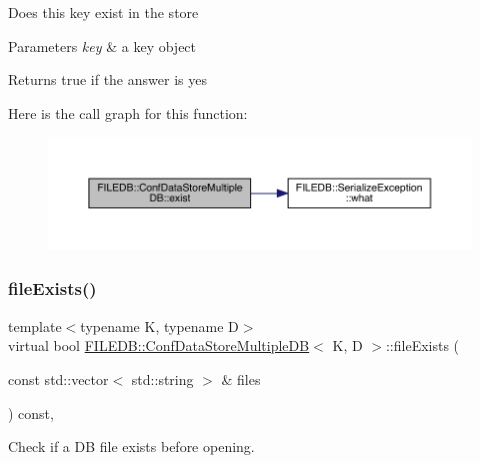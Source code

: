 Does this key exist in the store 
\begin{DoxyParams}{Parameters}
{\em key} & a key object \\
\hline
\end{DoxyParams}
\begin{DoxyReturn}{Returns}
true if the answer is yes 
\end{DoxyReturn}
Here is the call graph for this function\+:
\nopagebreak
\begin{figure}[H]
\begin{center}
\leavevmode
\includegraphics[width=350pt]{d3/dc0/classFILEDB_1_1ConfDataStoreMultipleDB_ad80312a9a4767f3b0b567932542d3ee7_cgraph}
\end{center}
\end{figure}
\mbox{\label{classFILEDB_1_1ConfDataStoreMultipleDB_a85c71818db3a3b0a5a67b4dabaed2ff7}} 
\subsubsection{\texorpdfstring{fileExists()}{fileExists()}\hspace{0.1cm}{\footnotesize\ttfamily [1/2]}}
{\footnotesize\ttfamily template$<$typename K, typename D$>$ \\
virtual bool \mbox{\hyperlink{classFILEDB_1_1ConfDataStoreMultipleDB}{F\+I\+L\+E\+D\+B\+::\+Conf\+Data\+Store\+Multiple\+DB}}$<$ K, D $>$\+::file\+Exists (\begin{DoxyParamCaption}\item[{const std\+::vector$<$ std\+::string $>$ \&}]{files }\end{DoxyParamCaption}) const\hspace{0.3cm}{\ttfamily [inline]}, {\ttfamily [virtual]}}

Check if a DB file exists before opening. \mbox{\label{classFILEDB_1_1ConfDataStoreMultipleDB_a85c71818db3a3b0a5a67b4dabaed2ff7}} 
